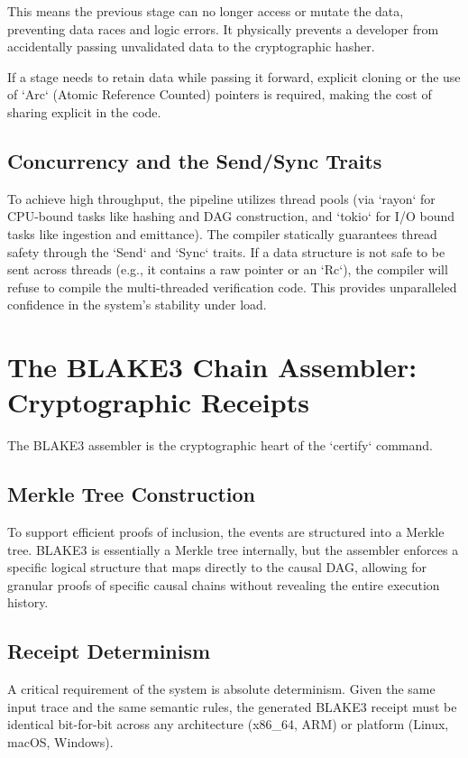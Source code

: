 This means the previous stage can no longer access or mutate the data, preventing data races and logic errors. It physically prevents a developer from accidentally passing unvalidated data to the cryptographic hasher.

If a stage needs to retain data while passing it forward, explicit cloning or the use of `Arc` (Atomic Reference Counted) pointers is required, making the cost of sharing explicit in the code.

\subsection{Concurrency and the Send/Sync Traits}
To achieve high throughput, the pipeline utilizes thread pools (via `rayon` for CPU-bound tasks like hashing and DAG construction, and `tokio` for I/O bound tasks like ingestion and emittance). The compiler statically guarantees thread safety through the `Send` and `Sync` traits. If a data structure is not safe to be sent across threads (e.g., it contains a raw pointer or an `Rc`), the compiler will refuse to compile the multi-threaded verification code. This provides unparalleled confidence in the system's stability under load.

\section{The BLAKE3 Chain Assembler: Cryptographic Receipts}
The BLAKE3 assembler is the cryptographic heart of the `certify` command.

\subsection{Merkle Tree Construction}
To support efficient proofs of inclusion, the events are structured into a Merkle tree. BLAKE3 is essentially a Merkle tree internally, but the assembler enforces a specific logical structure that maps directly to the causal DAG, allowing for granular proofs of specific causal chains without revealing the entire execution history.

\subsection{Receipt Determinism}
A critical requirement of the system is absolute determinism. Given the same input trace and the same semantic rules, the generated BLAKE3 receipt must be identical bit-for-bit across any architecture (x86_64, ARM) or platform (Linux, macOS, Windows).

